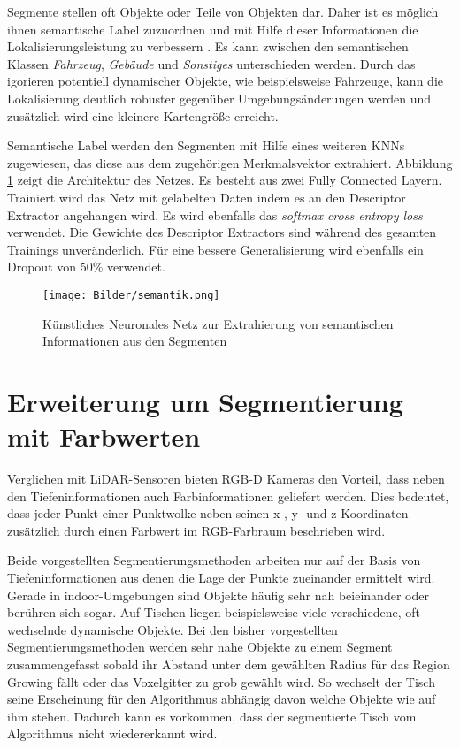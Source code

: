 Segmente stellen oft Objekte oder Teile von Objekten dar. Daher ist es möglich ihnen semantische Label zuzuordnen und mit Hilfe dieser Informationen die Lokalisierungsleistung zu verbessern \cite{Dube2019}. Es kann zwischen den semantischen Klassen \textit{Fahrzeug}, \textit{Gebäude} und \textit{Sonstiges} unterschieden werden. Durch das igorieren potentiell dynamischer Objekte, wie beispielsweise Fahrzeuge, kann die Lokalisierung deutlich robuster gegenüber Umgebungsänderungen werden und zusätzlich wird eine kleinere Kartengröße erreicht.  

Semantische Label werden den Segmenten mit Hilfe eines weiteren KNNs zu\-ge\-wie\-sen, das diese aus dem zugehörigen Merkmalsvektor extrahiert. Abbildung \ref{fig:semantik} zeigt die Architektur des Netzes. Es besteht aus zwei Fully Connected Layern. Trainiert wird das Netz mit gelabelten Daten indem es an den Descriptor Extractor angehangen wird. Es wird ebenfalls das \textit{softmax cross entropy loss} verwendet. Die Gewichte des Descriptor Extractors sind während des gesamten Trainings unveränderlich. Für eine bessere Generalisierung wird ebenfalls ein Dropout von 50\% verwendet. 

\begin{figure}
    \centering
    \texttt{[image: Bilder/semantik.png]}
    \caption{Künstliches Neuronales Netz zur Extrahierung von semantischen Informationen aus den Segmenten}
    \label{fig:semantik}
\end{figure}

\section[Erweiterung um Segmentierung mit Farbwerten (Kopp)]{Erweiterung um Segmentierung mit Farbwerten}
\label{sec:RGB-Segmentierung}

Verglichen mit LiDAR-Sensoren bieten RGB-D Kameras den Vorteil, dass neben den Tiefeninformationen auch Farbinformationen geliefert werden. Dies bedeutet, dass jeder Punkt einer Punktwolke neben seinen x-, y- und z-Koordinaten zusätzlich durch einen Farbwert im RGB-Farbraum beschrieben wird. 

Beide vorgestellten Segmentierungsmethoden arbeiten nur auf der Basis von Tiefeninformationen aus denen die Lage der Punkte zueinander ermittelt wird. Gerade in indoor-Umgebungen sind Objekte häufig sehr nah beieinander oder berühren sich sogar. Auf Tischen liegen beispielsweise viele verschiedene, oft wechselnde dynamische Objekte. Bei den bisher vorgestellten Segmentierungsmethoden werden sehr nahe  Objekte zu einem Segment zusammengefasst sobald ihr Abstand unter dem gewählten Radius für das  Region Growing fällt oder das Voxelgitter zu grob gewählt wird. So wechselt der Tisch seine Erscheinung für den Algorithmus abhängig davon welche Objekte wie auf ihm stehen. Dadurch kann es vorkommen, dass der segmentierte Tisch vom Algorithmus nicht wiedererkannt wird. 


